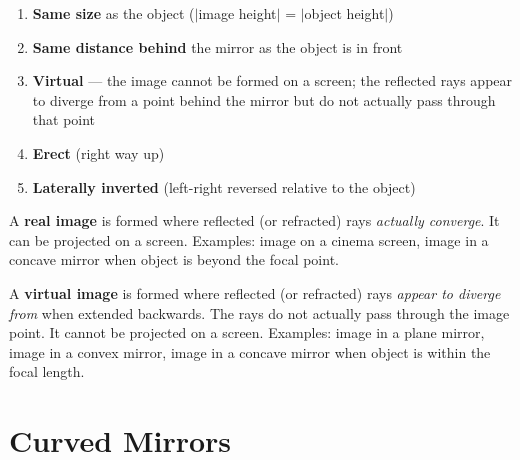 \begin{defbox}
\begin{enumerate}[noitemsep]
  \item \textbf{Same size} as the object
  ($|$image height$|$ = $|$object height$|$)
  \item \textbf{Same distance behind} the mirror
  as the object is in front
  \item \textbf{Virtual} --- the image cannot be
  formed on a screen; the reflected rays appear to
  diverge from a point behind the mirror but do not
  actually pass through that point
  \item \textbf{Erect} (right way up)
  \item \textbf{Laterally inverted} (left-right
  reversed relative to the object)
\end{enumerate}
\end{defbox}

\begin{definitionbox}
A \textbf{real image} is formed where reflected
(or refracted) rays \textit{actually converge}. It
can be projected on a screen. Examples: image on a
cinema screen, image in a concave mirror when object
is beyond the focal point.

A \textbf{virtual image} is formed where reflected
(or refracted) rays \textit{appear to diverge from}
when extended backwards. The rays do not actually
pass through the image point. It cannot be projected
on a screen. Examples: image in a plane mirror,
image in a convex mirror, image in a concave mirror
when object is within the focal length.
\end{definitionbox}

\section{Curved Mirrors}

